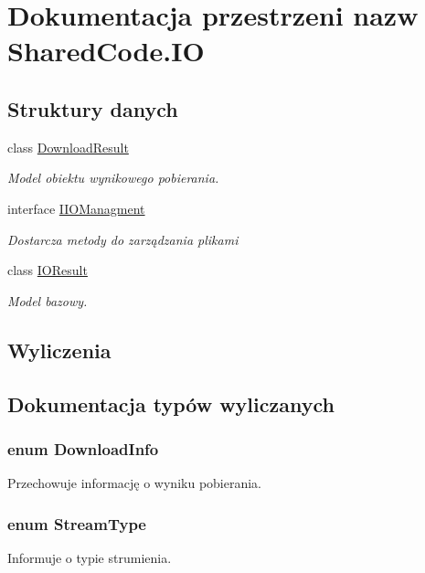 \hypertarget{a00309}{}\section{Dokumentacja przestrzeni nazw Shared\+Code.\+I\+O}
\label{a00309}
\subsection*{Struktury danych}
\begin{DoxyCompactItemize}
\item 
class \hyperlink{a00018}{Download\+Result}
\begin{DoxyCompactList}\small\item\em Model obiektu wynikowego pobierania. \end{DoxyCompactList}\item 
interface \hyperlink{a00023}{I\+I\+O\+Managment}
\begin{DoxyCompactList}\small\item\em Dostarcza metody do zarządzania plikami \end{DoxyCompactList}\item 
class \hyperlink{a00029}{I\+O\+Result}
\begin{DoxyCompactList}\small\item\em Model bazowy. \end{DoxyCompactList}\end{DoxyCompactItemize}
\subsection*{Wyliczenia}


\subsection{Dokumentacja typów wyliczanych}
\hypertarget{a00309_a702e786eceae19e4e37f55e9d6fc8561}{}
\subsubsection[{Download\+Info}]{\setlength{\rightskip}{0pt plus 5cm}enum Download\+Info\hspace{0.3cm}{\ttfamily [strong]}}\label{a00309_a702e786eceae19e4e37f55e9d6fc8561}


Przechowuje informację o wyniku pobierania. 

\hypertarget{a00309_a8a65141d9ea4bf9d2e2377ed6b888a1d}{}
\subsubsection[{Stream\+Type}]{\setlength{\rightskip}{0pt plus 5cm}enum Stream\+Type\hspace{0.3cm}{\ttfamily [strong]}}\label{a00309_a8a65141d9ea4bf9d2e2377ed6b888a1d}


Informuje o typie strumienia. 

